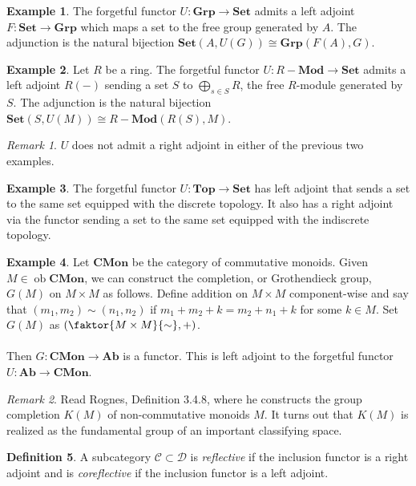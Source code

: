 \documentclass[10pt,letterpaper,cm]{nupset}
\theoremstyle{definition}
\newtheorem{definition}{Definition}
\newtheorem{exmp}[definition]{Example}
\theoremstyle{theorem}
\theoremstyle{remark}
\newtheorem{remark}{Remark}
\newcommand{\1}{\mathbf{1}}
\renewcommand{\c}{\mathscr{C}}
\renewcommand{\d}{\mathscr{D}}
\newcommand{\0}{\vec 0}
\DeclareMathOperator{\ob}{ob}
\begin{document}
\begin{exmp}
The forgetful functor $U: \mathbf{Grp} \to \mathbf{Set}$ admits a left adjoint $F: \mathbf{Set} \to \mathbf{Grp}$ which maps a set to the free group generated by $A$. The adjunction is the natural bijection $\mathbf{Set}(A, U(G)) \cong \mathbf{Grp}(F(A), G)$.
\end{exmp}

\begin{exmp}
Let $R$ be a ring. The forgetful functor $U: R-\mathbf{Mod}\to \mathbf{Set}$ admits a left adjoint $R(-)$ sending a set $S$ to $\bigoplus_{s\in S} R$, the free $R$-module generated by $S$. The adjunction is the natural bijection $\mathbf{Set}(S, U(M)) \cong R-\mathbf{Mod}(R(S), M)$.
\end{exmp}

\begin{remark}
$U$ does not admit a right adjoint in either of the previous two examples.
\end{remark}

\begin{exmp}
The forgetful functor $U: \mathbf{Top} \to \mathbf{Set}$ has left adjoint that sends a set to the same set equipped with the discrete topology.  It also has a right adjoint via the functor sending a set to the same set equipped with the indiscrete topology.
\end{exmp}

\begin{exmp}
Let $\mathbf{CMon}$ be the category of commutative monoids. Given $M\in \ob \mathbf{CMon}$, we can construct the completion, or Grothendieck group, $G(M)$ on $M\times M$ as follows. Define addition on $M \times M$ component-wise and say that $(m_1, m_2) \sim (n_1, n_2)$ if $m_1 + m_2 + k = m_2 +n_1 +k$ for some $k\in M$. Set $G(M)$ as $(\faktor{M\times M}{\sim}, +)$.
\\ \\
Then $G: \mathbf{CMon} \to \mathbf{Ab}$ is a functor. This is left adjoint to the forgetful functor $U: \mathbf{Ab} \to \mathbf{CMon}$.
\end{exmp}

\begin{remark}
Read Rognes, Definition 3.4.8, where he constructs the group completion $K(M)$ of non-commutative monoids $M$. It turns out that $K(M)$ is realized as the fundamental group of an important classifying space. 
\end{remark}

\begin{definition}
A subcategory $\c \subset \d$ is \textit{reflective} if the inclusion functor is a right adjoint and is \textit{coreflective} if the inclusion functor is a left adjoint. 
\end{definition}
\end{document}
